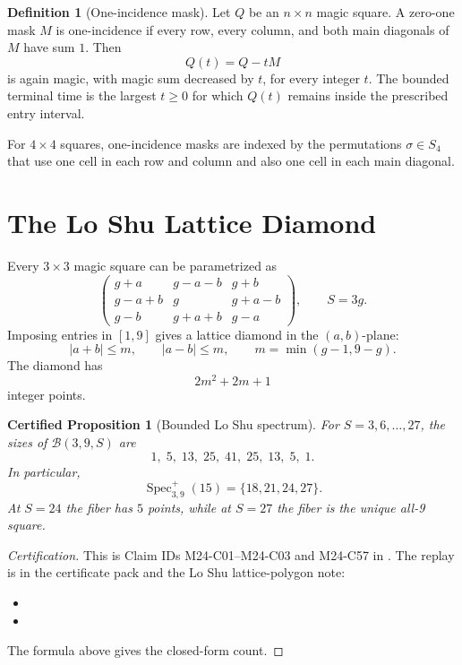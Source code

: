 \documentclass[11pt,a4paper]{article}
\newtheorem{certprop}[theorem]{Certified Proposition}
\theoremstyle{definition}
\newtheorem{definition}[theorem]{Definition}
\theoremstyle{remark}
\newcommand{\B}{\mathcal B}
\newcommand{\Spec}{\operatorname{Spec}}
\begin{document}
\begin{definition}[One-incidence mask]
Let \(Q\) be an \(n\times n\) magic square.  A zero-one mask \(M\) is
one-incidence if every row, every column, and both main diagonals of \(M\)
have sum \(1\).  Then
\[
Q(t)=Q-tM
\]
is again magic, with magic sum decreased by \(t\), for every integer \(t\).
The bounded terminal time is the largest \(t\ge 0\) for which \(Q(t)\) remains
inside the prescribed entry interval.
\end{definition}

For \(4\times4\) squares, one-incidence masks are indexed by the
permutations \(\sigma\in S_4\) that use one cell in each row and column and
also one cell in each main diagonal.

\section{The Lo Shu Lattice Diamond}
\label{sec:loshu}

Every \(3\times3\) magic square can be parametrized as
\[
\begin{pmatrix}
g+a & g-a-b & g+b\\
g-a+b & g & g+a-b\\
g-b & g+a+b & g-a
\end{pmatrix},
\qquad S=3g.
\]
Imposing entries in \([1,9]\) gives a lattice diamond in the \((a,b)\)-plane:
\[
|a+b|\le m,\qquad |a-b|\le m,\qquad
m=\min(g-1,9-g).
\]
The diamond has
\[
2m^2+2m+1
\]
integer points.

\begin{certprop}[Bounded Lo Shu spectrum]
\label{prop:loshu-spectrum}
For \(S=3,6,\ldots,27\), the sizes of \(\B(3,9,S)\) are
\[
1,\;5,\;13,\;25,\;41,\;25,\;13,\;5,\;1.
\]
In particular,
\[
\Spec^+_{3,9}(15)=\{18,21,24,27\}.
\]
At \(S=24\) the fiber has \(5\) points, while at \(S=27\) the fiber is the
unique all-9 square.
\end{certprop}

\begin{proof}[Certification]
This is Claim IDs M24-C01--M24-C03 and M24-C57 in
.  The replay is in the certificate pack and
the Lo Shu lattice-polygon note:
\begin{itemize}[leftmargin=*]
\item {}
\item {}
\end{itemize}
The formula above gives the closed-form count.
\end{proof}
\end{document}
